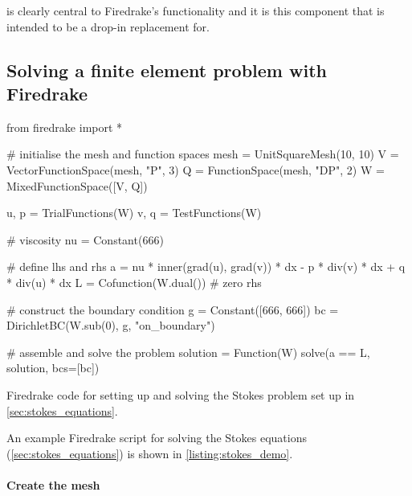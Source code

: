 \documentclass[thesis]{subfiles}
\begin{document}
\vspace{\baselineskip}

 is clearly central to Firedrake's functionality and it is this component that  is intended to be a drop-in replacement for.

\subsection{Solving a finite element problem with Firedrake}

\begin{listing}
  \centering
  \begin{minipage}{.9\textwidth}
    \begin{pyalg2}
      from firedrake import *

      # initialise the mesh and function spaces
      mesh = UnitSquareMesh(10, 10)
      V = VectorFunctionSpace(mesh, "P", 3)
      Q = FunctionSpace(mesh, "DP", 2)
      W = MixedFunctionSpace([V, Q])

      u, p = TrialFunctions(W)
      v, q = TestFunctions(W)

      # viscosity
      nu = Constant(666)

      # define lhs and rhs
      a = nu * inner(grad(u), grad(v)) * dx - p * div(v) * dx + q * div(u) * dx
      L = Cofunction(W.dual())  # zero rhs

      # construct the boundary condition
      g = Constant([666, 666])
      bc = DirichletBC(W.sub(0), g, "on_boundary")

      # assemble and solve the problem
      solution = Function(W)
      solve(a == L, solution, bcs=[bc])
    \end{pyalg2}
  \end{minipage}
  \caption{
    Firedrake code for setting up and solving the Stokes problem set up in \cref{sec:stokes_equations}.
  }
  \label{listing:stokes_demo}
\end{listing}

An example Firedrake script for solving the Stokes equations (\cref{sec:stokes_equations}) is shown in \cref{listing:stokes_demo}.


\paragraph{Create the mesh}
\end{document}
